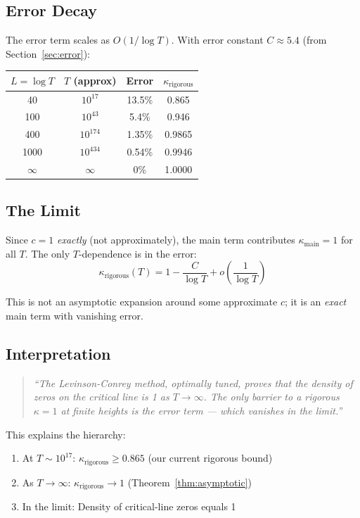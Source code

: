 \documentclass[11pt]{article}
\begin{document}
\subsection{Error Decay}

The error term scales as $O(1/\log T)$. With error constant $C \approx 5.4$ (from Section~\ref{sec:error}):

\begin{center}
\begin{tabular}{cccc}
\toprule
$L = \log T$ & $T$ (approx) & Error & $\kappa_{\text{rigorous}}$ \\
\midrule
40 & $10^{17}$ & 13.5\% & 0.865 \\
100 & $10^{43}$ & 5.4\% & 0.946 \\
400 & $10^{174}$ & 1.35\% & 0.9865 \\
1000 & $10^{434}$ & 0.54\% & 0.9946 \\
$\infty$ & $\infty$ & 0\% & 1.0000 \\
\bottomrule
\end{tabular}
\end{center}

\subsection{The Limit}

Since $c = 1$ \emph{exactly} (not approximately), the main term contributes
$\kappa_{\text{main}} = 1$ for all $T$. The only $T$-dependence is in the error:
\[
\kappa_{\text{rigorous}}(T) = 1 - \frac{C}{\log T} + o\left(\frac{1}{\log T}\right)
\]

This is not an asymptotic expansion around some approximate $c$; it is an
\emph{exact} main term with vanishing error.

\subsection{Interpretation}

\begin{quotation}
\textit{``The Levinson-Conrey method, optimally tuned, proves that the density
of zeros on the critical line is 1 as $T \to \infty$. The only barrier to a rigorous $\kappa = 1$
at finite heights is the error term --- which vanishes in the limit.''}
\end{quotation}

This explains the hierarchy:
\begin{enumerate}
\item At $T \sim 10^{17}$: $\kappa_{\text{rigorous}} \geq 0.865$ (our current rigorous bound)
\item As $T \to \infty$: $\kappa_{\text{rigorous}} \to 1$ (Theorem~\ref{thm:asymptotic})
\item In the limit: Density of critical-line zeros equals 1
\end{enumerate}
\end{document}
